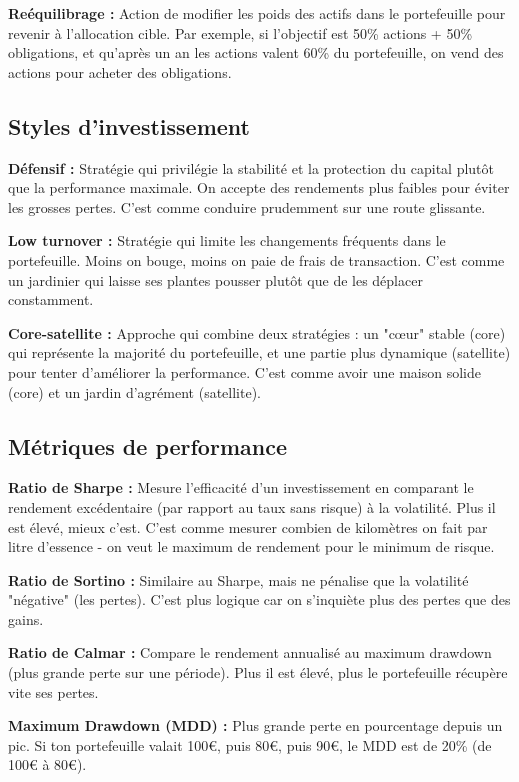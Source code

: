 \documentclass[11pt,a4paper]{article}
\begin{document}
\textbf{Reéquilibrage :} Action de modifier les poids des actifs dans le portefeuille pour revenir à l'allocation cible. Par exemple, si l'objectif est 50\% actions + 50\% obligations, et qu'après un an les actions valent 60\% du portefeuille, on vend des actions pour acheter des obligations.

\subsection{Styles d'investissement}

\textbf{Défensif :} Stratégie qui privilégie la stabilité et la protection du capital plutôt que la performance maximale. On accepte des rendements plus faibles pour éviter les grosses pertes. C'est comme conduire prudemment sur une route glissante.

\textbf{Low turnover :} Stratégie qui limite les changements fréquents dans le portefeuille. Moins on bouge, moins on paie de frais de transaction. C'est comme un jardinier qui laisse ses plantes pousser plutôt que de les déplacer constamment.

\textbf{Core-satellite :} Approche qui combine deux stratégies : un "cœur" stable (core) qui représente la majorité du portefeuille, et une partie plus dynamique (satellite) pour tenter d'améliorer la performance. C'est comme avoir une maison solide (core) et un jardin d'agrément (satellite).

\subsection{Métriques de performance}

\textbf{Ratio de Sharpe :} Mesure l'efficacité d'un investissement en comparant le rendement excédentaire (par rapport au taux sans risque) à la volatilité. Plus il est élevé, mieux c'est. C'est comme mesurer combien de kilomètres on fait par litre d'essence - on veut le maximum de rendement pour le minimum de risque.

\textbf{Ratio de Sortino :} Similaire au Sharpe, mais ne pénalise que la volatilité "négative" (les pertes). C'est plus logique car on s'inquiète plus des pertes que des gains.

\textbf{Ratio de Calmar :} Compare le rendement annualisé au maximum drawdown (plus grande perte sur une période). Plus il est élevé, plus le portefeuille récupère vite ses pertes.

\textbf{Maximum Drawdown (MDD) :} Plus grande perte en pourcentage depuis un pic. Si ton portefeuille valait 100€, puis 80€, puis 90€, le MDD est de 20\% (de 100€ à 80€).
\end{document}
